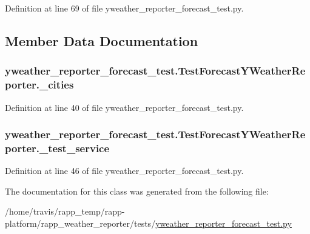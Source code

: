 Definition at line 69 of file yweather\-\_\-reporter\-\_\-forecast\-\_\-test.\-py.



\subsection{Member Data Documentation}
\hypertarget{classyweather__reporter__forecast__test_1_1TestForecastYWeatherReporter_a3c4be15f4d792d68605b6101107e2e64}{
\subsubsection[{\-\_\-cities}]{\setlength{\rightskip}{0pt plus 5cm}yweather\-\_\-reporter\-\_\-forecast\-\_\-test.\-Test\-Forecast\-Y\-Weather\-Reporter.\-\_\-cities\hspace{0.3cm}{\ttfamily [private]}}}\label{classyweather__reporter__forecast__test_1_1TestForecastYWeatherReporter_a3c4be15f4d792d68605b6101107e2e64}


Definition at line 40 of file yweather\-\_\-reporter\-\_\-forecast\-\_\-test.\-py.

\hypertarget{classyweather__reporter__forecast__test_1_1TestForecastYWeatherReporter_a13a042e1b15c55dd3d8e9d65406d4dd3}{
\subsubsection[{\-\_\-test\-\_\-service}]{\setlength{\rightskip}{0pt plus 5cm}yweather\-\_\-reporter\-\_\-forecast\-\_\-test.\-Test\-Forecast\-Y\-Weather\-Reporter.\-\_\-test\-\_\-service\hspace{0.3cm}{\ttfamily [private]}}}\label{classyweather__reporter__forecast__test_1_1TestForecastYWeatherReporter_a13a042e1b15c55dd3d8e9d65406d4dd3}


Definition at line 46 of file yweather\-\_\-reporter\-\_\-forecast\-\_\-test.\-py.



The documentation for this class was generated from the following file\-:\begin{DoxyCompactItemize}
\item 
/home/travis/rapp\-\_\-temp/rapp-\/platform/rapp\-\_\-weather\-\_\-reporter/tests/\hyperlink{yweather__reporter__forecast__test_8py}{yweather\-\_\-reporter\-\_\-forecast\-\_\-test.\-py}\end{DoxyCompactItemize}
